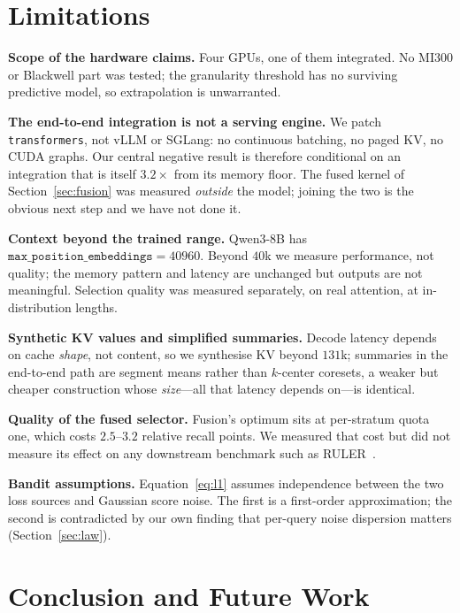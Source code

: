 \documentclass[sigconf,nonacm,11pt]{acmart}
\begin{document}
\section{Limitations}

\textbf{Scope of the hardware claims.} Four GPUs, one of them integrated. No
MI300 or Blackwell part was tested; the granularity threshold has no surviving
predictive model, so extrapolation is unwarranted.

\textbf{The end-to-end integration is not a serving engine.} We patch
\texttt{transformers}, not vLLM or SGLang: no continuous batching, no paged KV,
no CUDA graphs. Our central negative result is therefore conditional on an
integration that is itself $3.2\times$ from its memory floor. The fused kernel of
Section~\ref{sec:fusion} was measured \emph{outside} the model; joining the two is
the obvious next step and we have not done it.

\textbf{Context beyond the trained range.} Qwen3-8B has
$\texttt{max\_position\_embeddings}=40960$. Beyond $40$k we measure performance,
not quality; the memory pattern and latency are unchanged but outputs are not
meaningful. Selection quality was measured separately, on real attention, at
in-distribution lengths.

\textbf{Synthetic KV values and simplified summaries.} Decode latency depends on
cache \emph{shape}, not content, so we synthesise KV beyond $131$k; summaries in
the end-to-end path are segment means rather than $k$-center coresets, a weaker
but cheaper construction whose \emph{size}---all that latency depends on---is
identical.

\textbf{Quality of the fused selector.} Fusion's optimum sits at per-stratum
quota one, which costs $2.5$--$3.2$ relative recall points. We measured that cost
but did not measure its effect on any downstream benchmark such as
RULER~\cite{hsieh2024ruler}.

\textbf{Bandit assumptions.} Equation~\eqref{eq:l1} assumes independence between
the two loss sources and Gaussian score noise. The first is a first-order
approximation; the second is contradicted by our own finding that per-query noise
dispersion matters (Section~\ref{sec:law}).

\section{Conclusion and Future Work}
\end{document}
